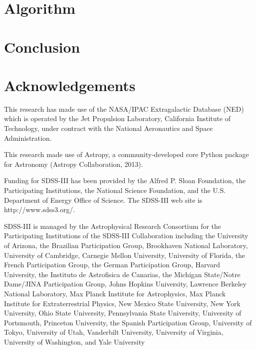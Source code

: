 \documentclass[5p]{elsarticle}
\begin{document}
\section{Algorithm}

%
%

\section{Conclusion}

\section{Acknowledgements}
This research has made use of the NASA/IPAC Extragalactic Database (NED) which is operated by the Jet Propulsion Laboratory, California Institute of Technology, under contract with the National Aeronautics and Space Administration.

This research made use of Astropy, a community-developed core Python package for Astronomy (Astropy Collaboration, 2013).

Funding for SDSS-III has been provided by the Alfred P. Sloan Foundation, the Participating Institutions, the National Science Foundation, and the U.S. Department of Energy Office of Science. The SDSS-III web site is http://www.sdss3.org/.

SDSS-III is managed by the Astrophysical Research Consortium for the Participating Institutions of the SDSS-III Collaboration including the University of Arizona, the Brazilian Participation Group, Brookhaven National Laboratory, University of Cambridge, Carnegie Mellon University, University of Florida, the French Participation Group, the German Participation Group, Harvard University, the Instituto de Astrofisica de Canarias, the Michigan State/Notre Dame/JINA Participation Group, Johns Hopkins University, Lawrence Berkeley National Laboratory, Max Planck Institute for Astrophysics, Max Planck Institute for Extraterrestrial Physics, New Mexico State University, New York University, Ohio State University, Pennsylvania State University, University of Portsmouth, Princeton University, the Spanish Participation Group, University of Tokyo, University of Utah, Vanderbilt University, University of Virginia, University of Washington, and Yale University

\end{document}
